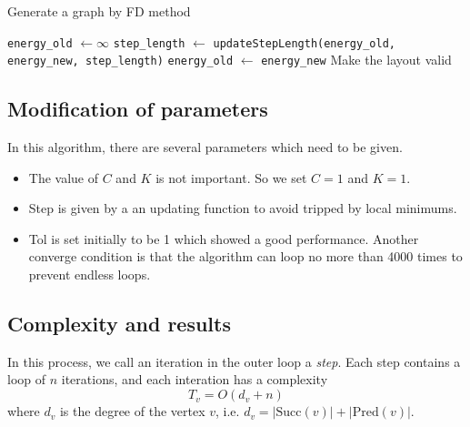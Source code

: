 \begin{algorithm}
    \caption{Generate a graph by FD method}
    \label{alg:force_directed}
    \begin{algorithmic}
    \STATE \lstinline{energy_old} $\gets \infty$ 
        \ENDIF
        \ENDFOR
        \STATE \lstinline{step_length} $\gets$ \lstinline{updateStepLength(energy_old, energy_new, step_length)}
        \STATE \lstinline{energy_old} $\gets$ \lstinline{energy_new}
    \ENDFOR
    \STATE Make the layout valid
    \end{algorithmic}
\end{algorithm}



\subsection{Modification of parameters}
In this algorithm, there are several parameters which need to be given. 

\begin{itemize}
    \item The value of $C$ and $K$ is not important. So we set $C = 1$ and $K = 1$. \cite{hu2006}
    \item Step is given by a an updating function to avoid tripped by local minimums. \cite{hu2006}
    \item Tol is set initially to be 1 which showed a good performance. Another converge condition is that the algorithm can loop no more than 4000 times to prevent endless loops.
\end{itemize}

\subsection{Complexity and results}
In this process, we call an iteration in the outer loop a \textit{step}. Each step contains a loop of $n$ iterations, and each interation has a complexity $$T_v = O(d_v + n)$$ 
where $d_v$ is the degree of the vertex $v$, i.e. $d_v = |\text{Succ}(v)| + |\text{Pred}(v)|$.

